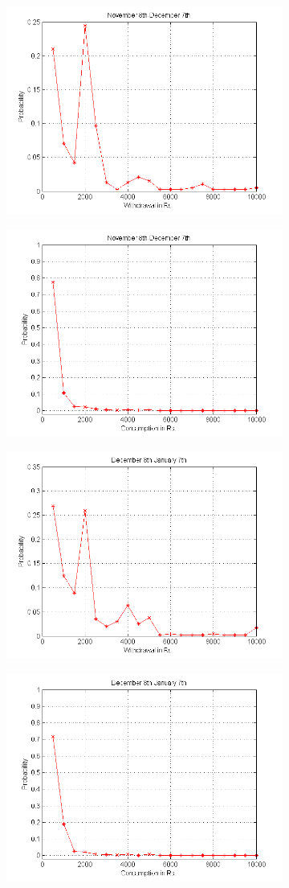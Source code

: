 \documentclass[12pt]{article}
\begin{document}
\begin{figure}[H]
\centering
\begin{subfigure}
  \centering
  \includegraphics[width=.43\linewidth]{WNOV.png}
\end{subfigure}
\begin{subfigure}
  \centering
  \includegraphics[width=.43\linewidth]{CNOV.png}
\end{subfigure}
\label{fig:test}
\end{figure}
\begin{figure}[H]
\centering
\begin{subfigure}
  \centering
  \includegraphics[width=.43\linewidth]{WDEC.png}
\end{subfigure}
\begin{subfigure}
  \centering
  \includegraphics[width=.43\linewidth]{CDEC.png}
\end{subfigure}
\label{fig:test}
\end{figure}
\end{document}

